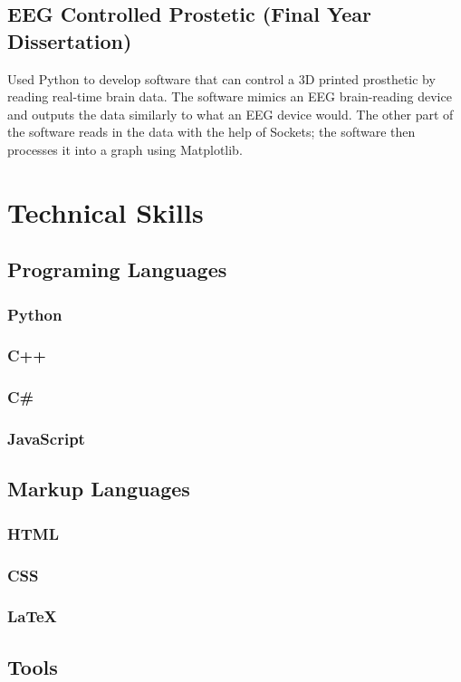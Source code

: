 \documentclass{article}
\begin{document}
\begin{multicols}{2}
    \subsection{EEG Controlled Prostetic (Final Year Dissertation)}
    Used Python to develop software that can control a 3D printed prosthetic by reading real-time brain data. 
    The software mimics an EEG brain-reading device and outputs the data similarly to what an EEG device would. 
    The other part of the software reads in the data with the help of Sockets; 
    the software then processes it into a graph using Matplotlib. 
    \section{Technical Skills}
        \subsection{Programing Languages}
        \subsubsection{Python}
        \subsubsection{C++}
        \subsubsection{C\#}
        \subsubsection{JavaScript}
        \subsection{Markup Languages}
            \subsubsection{HTML}
            \subsubsection{CSS}
            \subsubsection{LaTeX}
        \subsection{Tools}

\end{multicols}
\end{document}
